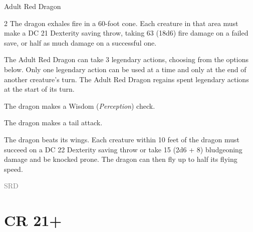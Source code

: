 \documentclass[letterpaper, 11pt, bg=full, twocolumn, stats=modern]{dndbook}
\begin{document}
\begin{DndMonster}[float*=tp,width=\textwidth + 8pt, toptitle=0pt, top=1pt]{Adult Red Dragon}
\begin{multicols}{2}
The dragon exhales fire in a 60-foot cone. Each creature in that area must make a DC 21 Dexterity saving throw, taking 63 (18d6) fire damage on a failed save, or half as much damage on a successful one.

The Adult Red Dragon can take 3 legendary actions, choosing from the options below. Only one legendary action can be used at a time and only at the end of another creature's turn. The Adult Red Dragon regains spent legendary actions at the start of its turn.

The dragon makes a Wisdom (\textit{Perception}) check.

The dragon makes a tail attack.

The dragon beats its wings. Each creature within 10 feet of the dragon must succeed on a DC 22 Dexterity saving throw or take 15 (2d6 + 8) bludgeoning damage and be knocked prone. The dragon can then fly up to half its flying speed.

\vspace{2pt}
\noindent\hfill{\scriptsize\textcolor{gray}{SRD}}

\endgroup
\end{multicols}
\end{DndMonster}

\vspace{2em}

\FloatBarrier

\section{CR 21+}

\vspace{0.5em}

\end{document}
